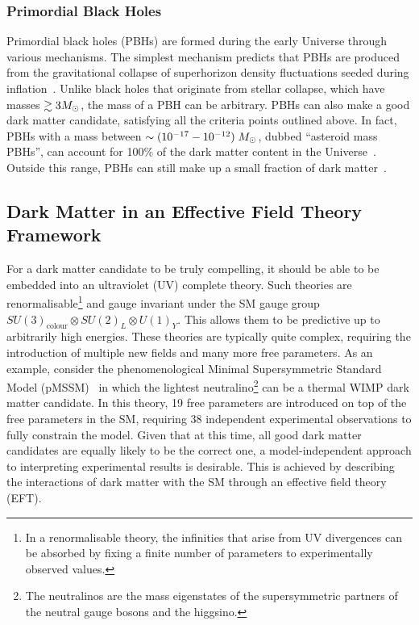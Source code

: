 \subsubsection*{Primordial Black Holes}

Primordial black holes (PBHs) are formed during the early Universe through various mechanisms. The simplest mechanism predicts that PBHs are produced from the gravitational collapse of superhorizon density fluctuations seeded during inflation~\cite{Hawking:1971ei_apr_Gravitationallycollapsedobjects, Carr:1974nx_Blackholesearly,Carr:1975qj_Primordialblackhole}. 
Unlike black holes that originate from stellar collapse, which have masses $\gtrsim 3M_\odot$, the mass of a PBH can be arbitrary.  PBHs can also make a good dark matter candidate, satisfying all the criteria points outlined above. In fact, PBHs with a mass between $\sim (10^{-17} - 10^{-12})\;M_\odot$, dubbed ``asteroid mass PBHs'', can account for 100\% of the dark matter content in the Universe~\cite{Montero-Camacho:2019jte_aug_Revisitingconstraintsasteroidmass}. Outside this range, PBHs can still make up a small fraction of dark matter~\cite{Villanueva-Domingo:2021spv_may_Briefreviewprimordial}. 

\subsection{Dark Matter in an Effective Field Theory Framework}
\label{ch1:subsec:DM_EFTs}

For a dark matter candidate to be truly compelling, it should be able to be embedded into an ultraviolet (UV) complete theory. Such theories are renormalisable\footnote{In a renormalisable theory, the infinities that arise from UV divergences can be absorbed by fixing a finite number of parameters to experimentally observed values.} and gauge invariant under the SM gauge group $SU(3)_\mathrm{colour}\otimes SU(2)_L\otimes U(1)_Y$. This allows them to be predictive up to arbitrarily high energies. These theories are typically quite complex, requiring the introduction of multiple new fields and many more free parameters. As an example, consider the phenomenological Minimal Supersymmetric Standard Model (pMSSM)~\cite{Villanueva-Domingo:2021spv_may_Briefreviewprimordial} in which the lightest neutralino\footnote{The neutralinos are the mass eigenstates of the supersymmetric partners of the neutral gauge bosons and the higgsino.} can be a thermal WIMP dark matter candidate. In this theory, 19 free parameters are introduced on top of the free parameters in the SM, requiring 38 independent experimental observations to fully constrain the model. Given that at this time, all good dark matter candidates are equally likely to be the correct one, a model-independent approach to interpreting experimental results is desirable. This is achieved by describing the interactions of dark matter with the SM through an effective field theory (EFT).

